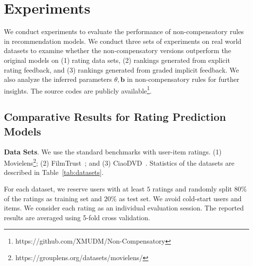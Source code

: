 \documentclass[letterpaper]{article} %
\begin{document}
\section{Experiments}\label{sec:experiment}
We conduct experiments to evaluate the performance of non-compensatory rules in recommendation models. We conduct three sets of experiments on real world datasets to examine whether the non-compensatory versions outperform the original models on (1) rating data sets, (2) rankings generated from explicit rating feedback, and (3) rankings generated from graded implicit feedback. We also analyze the inferred parameters $\theta,\mathbf{b}$ in non-compensatory rules for further insights. The source codes are publicly available\footnote{https://github.com/XMUDM/Non-Compensatory}.

\subsection{Comparative Results for Rating Prediction Models}

\textbf{Data Sets}. We use the standard benchmarks with user-item ratings. (1) Movielens\footnote{https://grouplens.org/datasets/movielens/}; (2) FilmTrust~\cite{Guo2013Novel}; and (3) CiaoDVD~\cite{Guo2014ETAF}. Statistics of the datasets are described in Table~\ref{tab:datasets}. 

For each dataset, we reserve users with at least $5$ ratings and randomly split $80\%$ of the ratings as training set and $20\%$ as test set. We avoid cold-start users and items. We consider each rating as an individual evaluation session. The reported results are averaged using 5-fold cross validation. 
\begin{table}[htp]
\caption{Statistics of Datasets with ratings}
\small
\centering
{}
\label{tab:datasets}
\end{table}
\end{document}
